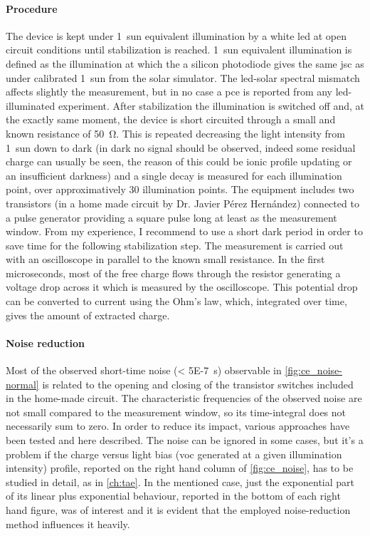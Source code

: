 	\paragraph{Procedure} The device is kept under 1~sun equivalent illumination by a white \gls{led} at open circuit conditions until stabilization is reached. 1~sun equivalent illumination is defined as the illumination at which the a silicon photodiode gives the same \gls{jsc} as under calibrated 1~sun from the solar simulator. The \gls{led}-solar spectral mismatch affects slightly the measurement, but in no case a \gls{pce} is reported from any \gls{led}-illuminated experiment. After stabilization the illumination is switched off and, at the exactly same moment, the device is short circuited through a small and known resistance of \SI{50}{\ohm}.
	This is repeated decreasing the light intensity from 1~sun down to dark (in dark no signal should be observed, indeed some residual charge can usually be seen, the reason of this could be ionic profile updating or an insufficient darkness) and a single decay is measured for each illumination point, over approximatively 30 illumination points.
	The equipment includes two transistors (in a home made circuit by Dr. Javier Pérez Hernández) connected to a pulse generator providing a square pulse long at least as the measurement window. From my experience, I recommend to use a short dark period in order to save time for the following stabilization step.
	The measurement is carried out with an oscilloscope in parallel to the known small resistance. In the first microseconds, most of the free charge flows through the resistor generating a voltage drop across it which is measured by the oscilloscope. This potential drop can be converted to current using the Ohm's law, which, integrated over time, gives the amount of extracted charge.

	\paragraph{Noise reduction}\label{r_ce_noise} Most of the observed short-time noise (\SI{< 5E-7}{\s}) observable in \cref{fig:ce_noise-normal} is related to the opening and closing of the transistor switches included in the home-made circuit. The characteristic frequencies of the observed noise are not small compared to the measurement window, so its time-integral does not necessarily sum to zero.
	In order to reduce its impact, various approaches have been tested and here described.
	The noise can be ignored in some cases, but it's a problem if the charge versus light bias (\gls{voc} generated at a given illumination intensity) profile, reported on the right hand column of \cref{fig:ce_noise}, has to be studied in detail, as in \cref{ch:tae}.
	In the mentioned case, just the exponential part of its linear plus exponential behaviour, reported in the bottom of each right hand figure, was of interest and it is evident that the employed noise-reduction method influences it heavily.
	

